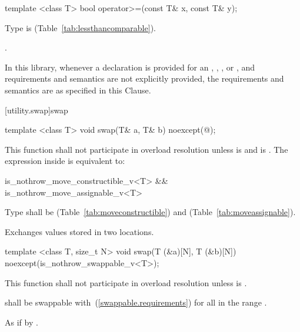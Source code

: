 %
\begin{itemdecl}
template <class T> bool operator>=(const T& x, const T& y);
\end{itemdecl}

\begin{itemdescr}
\pnum
\requires
Type  is  (Table~\ref{tab:lessthancomparable}).

\pnum
\returns
{}.
\end{itemdescr}

\pnum
In this library, whenever a declaration is provided for an ,
, , or ,
and requirements and semantics are not explicitly provided,
the requirements and semantics are as specified in this Clause.

[utility.swap]{swap}

%
\begin{itemdecl}
template <class T> void swap(T& a, T& b) noexcept(@\seebelow@);
\end{itemdecl}

\begin{itemdescr}
\pnum
\remarks This function shall not participate in overload resolution
unless  is  and
 is .
The expression inside  is equivalent to:

\begin{codeblock}
is_nothrow_move_constructible_v<T> && is_nothrow_move_assignable_v<T>
\end{codeblock}

\pnum
\requires
Type
shall be
 (Table~\ref{tab:moveconstructible})
and
 (Table~\ref{tab:moveassignable}).

\pnum
\effects
Exchanges values stored in two locations.
\end{itemdescr}

%
\begin{itemdecl}
template <class T, size_t N>
  void swap(T (&a)[N], T (&b)[N]) noexcept(is_nothrow_swappable_v<T>);
\end{itemdecl}

\begin{itemdescr}
\pnum
\remarks
This function shall not participate in overload resolution
unless  is .

\pnum
\requires
{} shall be swappable with~(\ref{swappable.requirements}) 
for all  in the range .

\pnum
\effects As if by .
\end{itemdescr}

